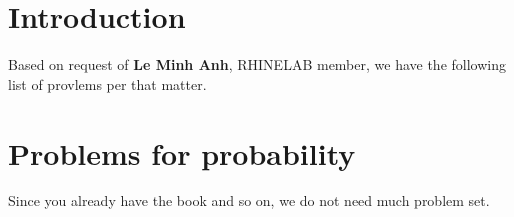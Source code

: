 \documentclass[10pt,a4paper]{article}
\begin{document}
\section{Introduction}

Based on request of \textbf{Le Minh Anh}, RHINELAB member, we have the following list of provlems per that matter. 

\section{Problems for probability}

Since you already have the book and so on, we do not need much problem set. 





\end{document}
